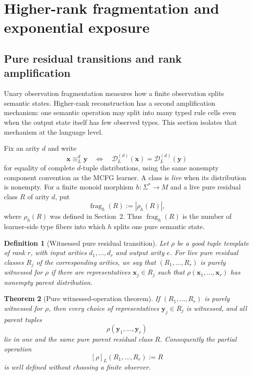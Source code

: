 \documentclass[11pt]{article}
\newtheorem{definition}{Definition}[section]
\newtheorem{theorem}[definition]{Theorem}
\newcommand{\D}{\mathcal D}
\newcommand{\frag}{\operatorname{frag}}
\begin{document}
\section{Higher-rank fragmentation and exponential exposure}
\label{sec:higher-rank}

\subsection{Pure residual transitions and rank amplification}
\label{sec:transition-fragmentation}

Unary observation fragmentation measures how a finite observation splits
semantic states.  Higher-rank reconstruction has a second amplification mechanism: one
semantic operation may split into many typed rule cells even when the output
state itself has few observed types.  This section isolates that mechanism at
the language level.

Fix an arity $d$ and write
\[
  \mathbf x\equiv^{d}_L\mathbf y
  \quad\Longleftrightarrow\quad
  \D^{(d)}_L(\mathbf x)=\D^{(d)}_L(\mathbf y)
\]
for equality of complete $d$-tuple distributions, using the same nonempty
component convention as the MCFG learner.  A class is \emph{live} when its
distribution is nonempty.  For a finite monoid morphism
$h:\Sigma^*\to M$ and a live pure residual class $R$ of arity $d$, put
\[
  \frag_h(R):=|\rho_h(R)|,
\]
where $\rho_h(R)$ was defined in Section~2.  Thus $\frag_h(R)$ is the number
of learner-side type fibers into which $h$ splits one pure semantic state.

\begin{definition}[Witnessed pure residual transition]
Let $\rho$ be a good tuple template of rank $r$, with input arities
$d_1,\ldots,d_r$ and output arity $e$.  For live pure residual classes $R_j$
of the corresponding arities, we say that $(R_1,\ldots,R_r)$ is
\emph{purely witnessed} for $\rho$ if there are representatives
$\mathbf x_j\in R_j$ such that
$\rho(\mathbf x_1,\ldots,\mathbf x_r)$ has nonempty parent distribution.
\end{definition}

\begin{theorem}[Pure witnessed-operation theorem]
\label{thm:pure-witnessed-operation}
If $(R_1,\ldots,R_r)$ is purely witnessed for $\rho$, then every
choice of representatives $\mathbf y_j\in R_j$ is witnessed, and all parent
tuples
\[
  \rho(\mathbf y_1,\ldots,\mathbf y_r)
\]
lie in one and the same pure parent residual class $R$.  Consequently the
partial operation
\[
  [\rho]_{L}(R_1,\ldots,R_r):=R
\]
is well defined without choosing a finite observer.
\end{theorem}
\end{document}
